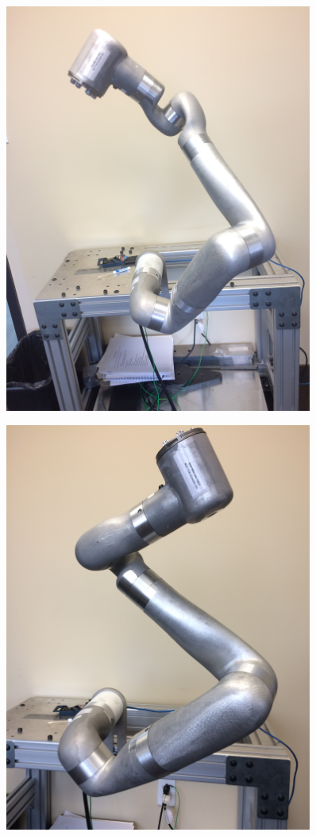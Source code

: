 \begin{figure}
	\centering
	\begin{minipage}{.5\textwidth}
		\centering
		\includegraphics[width=0.9\textwidth]{./images/Pose1}
		\label{fig:pose1}
	\end{minipage}%
	\begin{minipage}{.5\textwidth}
		\centering
		\includegraphics[width=0.9\textwidth]{./images/Pose2}

\end{minipage}
\end{figure}

